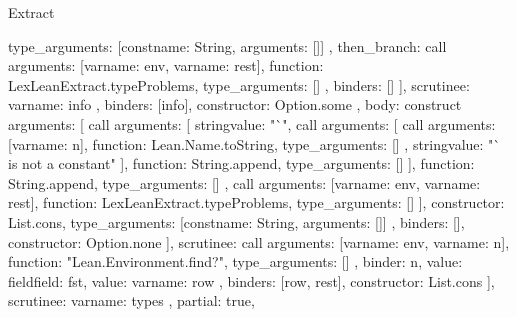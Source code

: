 \begin{lexlean}{Extract}
\begin{toolingmodule}
{{{{{{{{{{{                              type_arguments: [const{name: String, arguments: []}]
                            },
                            then_branch: call{
                              arguments: [var{name: env}, var{name: rest}],
                              function: LexLeanExtract.typeProblems,
                              type_arguments: []
                            }
                          },
                          binders: []
                        }
                      ],
                      scrutinee: var{name: info}
                    },
                    binders: [info],
                    constructor: Option.some
                  },
                  {
                    body: construct{
                      arguments: [
                        call{
                          arguments: [
                            string{value: "`"},
                            call{
                              arguments: [
                                call{
                                  arguments: [var{name: n}],
                                  function: Lean.Name.toString,
                                  type_arguments: []
                                },
                                string{value: "` is not a constant"}
                              ],
                              function: String.append,
                              type_arguments: []
                            }
                          ],
                          function: String.append,
                          type_arguments: []
                        },
                        call{
                          arguments: [var{name: env}, var{name: rest}],
                          function: LexLeanExtract.typeProblems,
                          type_arguments: []
                        }
                      ],
                      constructor: List.cons,
                      type_arguments: [const{name: String, arguments: []}]
                    },
                    binders: [],
                    constructor: Option.none
                  }
                ],
                scrutinee: call{
                  arguments: [var{name: env}, var{name: n}],
                  function: "Lean.Environment.find?",
                  type_arguments: []
                }
              },
              binder: n,
              value: field{field: fst, value: var{name: row}}
            },
            binders: [row, rest],
            constructor: List.cons
          }
        ],
        scrutinee: var{name: types}
      },
      partial: true,
}}
\end{toolingmodule}
\end{lexlean}
